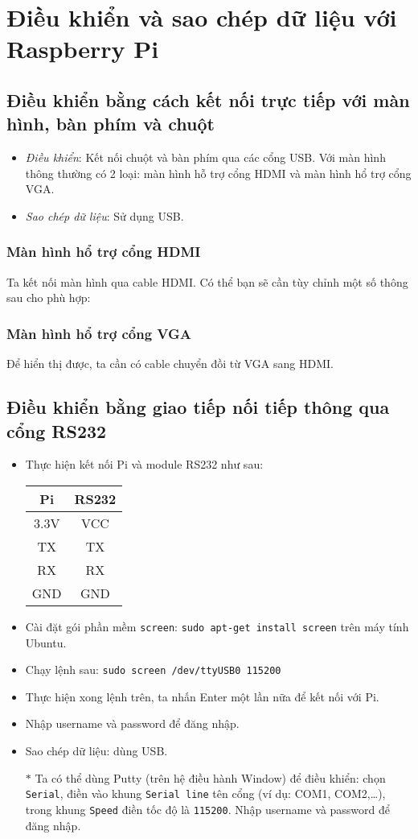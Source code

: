 \chapter{Điều khiển và sao chép dữ liệu với Raspberry Pi}
\section{Điều khiển bằng cách kết nối trực tiếp với màn hình, bàn phím và chuột}
\begin{itemize}
\item \textit{Điều khiển}: Kết nối chuột và bàn phím qua các cổng USB. Với màn hình thông thường có 2 loại: màn hình hỗ trợ cổng HDMI và màn hình hổ trợ cổng VGA.
\item \textit{Sao chép dữ liệu}: Sử dụng USB.
\end{itemize}
\subsection{Màn hình hổ trợ cổng HDMI}
Ta kết nối màn hình qua cable HDMI. Có thể bạn sẽ cần tùy chỉnh một số thông sau cho phù hợp:
\subsection{Màn hình hổ trợ cổng VGA}
Để hiển thị được, ta cần có cable chuyển đồi từ VGA sang HDMI.
\section{Điều khiển bằng giao tiếp nối tiếp thông qua cổng RS232}
\begin{itemize}
\item Thực hiện kết nối Pi và module RS232 như sau:
\begin{center}
\begin{tabular}{c|c}
Pi & RS232\\ \hline
3.3V & VCC\\
TX & TX \\ 
RX & RX\\
GND & GND
\end{tabular}
\end{center}
\item Cài đặt gói phần mềm \verb|screen|: \verb|sudo apt-get install screen| trên máy tính Ubuntu.
\item Chạy lệnh sau: \verb|sudo screen /dev/ttyUSB0 115200|
\item Thực hiện xong lệnh trên, ta nhấn Enter một lần nữa để kết nối với Pi.
\item Nhập username và password để đăng nhập.
\item Sao chép dữ liệu: dùng USB.
\item[$\ast$] Ta có thể dùng Putty (trên hệ điều hành Window) để điều khiển: chọn \verb|Serial|, điền vào khung \verb|Serial line| tên cổng (ví dụ: COM1, COM2,\ldots), trong khung \verb|Speed| điền tốc độ là \verb|115200|. Nhập username và password để đăng nhập.
\end{itemize}
